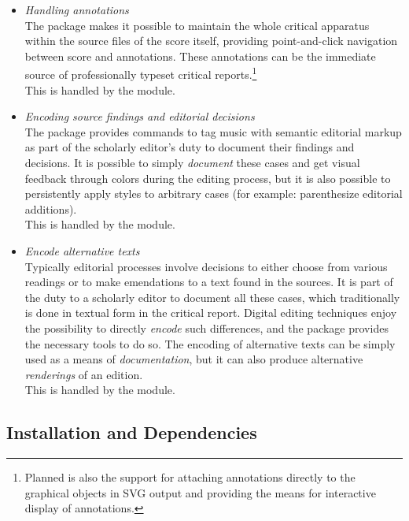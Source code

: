 \documentclass[]{ollmanual}
\providecommand{\tightlist}{%
  \setlength{\itemsep}{0pt}\setlength{\parskip}{0pt}}
\begin{document}
\begin{itemize}
\tightlist
\item
  \emph{Handling annotations}\\
  The package makes it possible to maintain the whole critical apparatus
  within the source files of the score itself, providing point-and-click
  navigation between score and annotations. These annotations can be the
  immediate source of professionally typeset critical reports.\footnote{Planned
    is also the support for attaching annotations directly to the
    graphical objects in SVG output and providing the means for
    interactive display of annotations.}\\
  This is handled by the  module.
\item
  \emph{Encoding source findings and editorial decisions}\\
  The package provides commands to tag music with semantic editorial
  markup as part of the scholarly editor's duty to document their
  findings and decisions. It is possible to simply \emph{document} these
  cases and get visual feedback through colors during the editing
  process, but it is also possible to persistently apply styles to
  arbitrary cases (for example: parenthesize editorial additions).\\
  This is handled by the  module.
\item
  \emph{Encode alternative texts}\\
  Typically editorial processes involve decisions to either choose from
  various readings or to make emendations to a text found in the
  sources. It is part of the duty to a scholarly editor to document all
  these cases, which traditionally is done in textual form in the
  critical report. Digital editing techniques enjoy the possibility to
  directly \emph{encode} such differences, and the package provides the
  necessary tools to do so. The encoding of alternative texts can be
  simply used as a means of \emph{documentation}, but it can also
  produce alternative \emph{renderings} of an edition.\\
  This is handled by the  module.
\end{itemize}

\hypertarget{installation-and-dependencies}{%
\subsection{Installation and
Dependencies}\label{installation-and-dependencies}}
\end{document}
